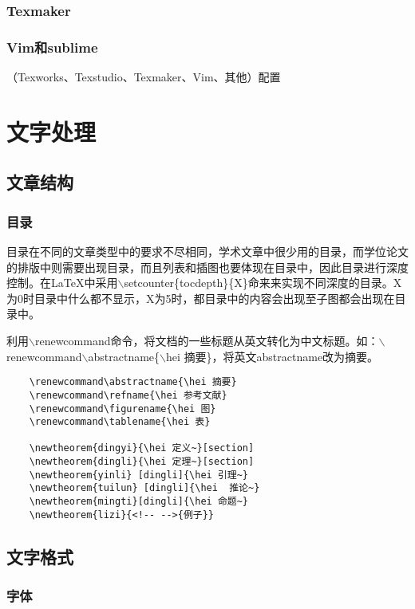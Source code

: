 \documentclass[cn,10pt,math=newtx,citestyle=gb7714-2015,bibstyle=gb7714-2015]{elegantbook}
\begin{document}
\subsection{Texmaker}

\subsection{Vim和sublime}
（Texworks、Texstudio、Texmaker、Vim、其他）配置
\chapter{文字处理}


\section{文章结构}


\subsection{目录}

目录在不同的文章类型中的要求不尽相同，学术文章中很少用的目录，而学位论文的排版中则需要出现目录，而且列表和插图也要体现在目录中，因此目录进行深度控制。在\LaTeX{}中采用$\backslash$setcounter\{tocdepth\}\{X\}命来来实现不同深度的目录。X为0时目录中什么都不显示，X为5时，都目录中的内容会出现至子图都会出现在目录中。

利用$\backslash$renewcommand命令，将文档的一些标题从英文转化为中文标题。如：$\backslash$renewcommand$\backslash$abstractname\{$\backslash$hei 摘要\}，将英文abstractname改为摘要。

\begin{lstlisting}
	\renewcommand\abstractname{\hei 摘要}
	\renewcommand\refname{\hei 参考文献}
	\renewcommand\figurename{\hei 图}
	\renewcommand\tablename{\hei 表}
	
	\newtheorem{dingyi}{\hei 定义~}[section]
	\newtheorem{dingli}{\hei 定理~}[section]
	\newtheorem{yinli} [dingli]{\hei 引理~}
	\newtheorem{tuilun} [dingli]{\hei  推论~}
	\newtheorem{mingti}[dingli]{\hei 命题~}
	\newtheorem{lizi}{<!-- -->{例子}}
\end{lstlisting}


\section{文字格式}

\subsection{字体}
\end{document}
